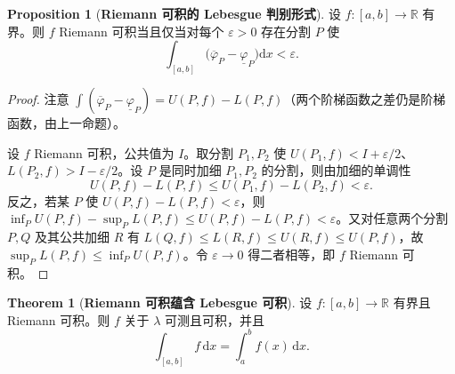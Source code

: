 \documentclass[oneside]{book}
\theoremstyle{definition}
\newcommand{\R}{\mathbb{R}}
\newcommand{\dd}{\mathrm{d}}
\theoremstyle{definition}
\newtheorem{proposition}{Proposition}[section]
\newtheorem{theorem}{Theorem}[section]
\begin{document}
	\begin{proposition}[\bfseries{Riemann 可积的 Lebesgue 判别形式}]
		设 $f:[a,b]\to\R$ 有界。则 $f$ Riemann 可积当且仅当对每个 $\varepsilon>0$ 存在分割 $P$ 使
		\[
		\int_{[a,b]}\bigl(\overline{\varphi}_P-\underline{\varphi}_P\bigr)\dd x<\varepsilon .
		\]
	\end{proposition}
	
	\begin{proof}
		注意 $\int(\overline{\varphi}_P-\underline{\varphi}_P)=U(P,f)-L(P,f)$（两个阶梯函数之差仍是阶梯函数，由上一命题）。
		
		设 $f$ Riemann 可积，公共值为 $I$。取分割 $P_1,P_2$ 使 $U(P_1,f)<I+\varepsilon/2$、$L(P_2,f)>I-\varepsilon/2$。设 $P$ 是同时加细 $P_1,P_2$ 的分割，则由加细的单调性
		\[
		U(P,f)-L(P,f)\leqslant U(P_1,f)-L(P_2,f)<\varepsilon .
		\]
		反之，若某 $P$ 使 $U(P,f)-L(P,f)<\varepsilon$，则 $\inf_P U(P,f)-\sup_P L(P,f)\leqslant U(P,f)-L(P,f)<\varepsilon$。又对任意两个分割 $P,Q$ 及其公共加细 $R$ 有 $L(Q,f)\leqslant L(R,f)\leqslant U(R,f)\leqslant U(P,f)$，故 $\sup_P L(P,f)\leqslant\inf_P U(P,f)$。令 $\varepsilon\to0$ 得二者相等，即 $f$ Riemann 可积。
	\end{proof}
	
	\begin{theorem}[\bfseries{Riemann 可积蕴含 Lebesgue 可积}]
		设 $f:[a,b]\to\R$ 有界且 Riemann 可积。则 $f$ 关于 $\lambda$ 可测且可积，并且
		\[
		\int_{[a,b]}f\,\dd x=\int_a^b f(x)\,\dd x .
		\]
	\end{theorem}
	
\end{document}
